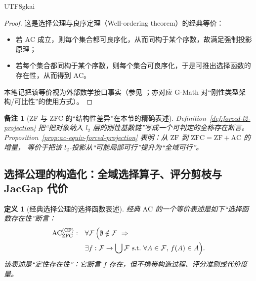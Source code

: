 \documentclass[12pt]{article}
\newtheorem{definition}{定义}[section]
\newtheorem{remark}{备注}[section]
\newcommand{\ZF}{\ensuremath{\mathrm{ZF}}}
\newcommand{\ZFC}{\ensuremath{\mathrm{ZFC}}}
\newcommand{\AC}{\ensuremath{\mathrm{AC}}}
\begin{document}
\begin{CJK*}{UTF8}{gkai}
\begin{proof}
这是选择公理与良序定理（Well-ordering theorem）的经典等价：
\begin{itemize}
  \item 若 $\AC$ 成立，则每个集合都可良序化，从而同构于某个序数，故满足强制投影原理；
  \item 若每个集合都同构于某个序数，则每个集合可良序化，于是可推出选择函数的存在性，从而得到 $\AC$。
\end{itemize}
本笔记把该等价视为外部数学接口事实（参见 \cite{JechSetTheory}；亦对应 G-Math\cite{GaoZheng2025GFramework} 对“刚性类型架构/可比性”的使用方式）。
\end{proof}

\begin{remark}[ZF 与 ZFC 的“结构性差异”在本节的精确表述]
Definition~\ref{def:forced-l2-projection} 把“把对象纳入 $l_2$ 层的刚性基数链”写成一个可判定的全称存在断言。
Proposition~\ref{prop:ac-equiv-forced-projection} 表明：从 $\ZF$ 到 $\ZFC=\ZF+\AC$ 的增量，
等价于把该 $l_2$-投影从“可能局部可行”提升为“全域可行”。
\end{remark}

\subsection{选择公理的构造化：全域选择算子、评分剪枝与 JacGap 代价}
\label{sec:ac-constructive-operator}

\begin{definition}[经典选择公理的选择函数表述]
\label{def:ac-choice-function}
经典 $\AC$ 的一个等价表述是如下“选择函数存在性”断言：
\begin{equation}
\label{eq:ac-choice-function}
\begin{aligned}
\AC_{\ZFC}^{(\mathrm{CF})}:\quad
&\forall \mathcal{F}\,
\Bigl(\emptyset\notin\mathcal{F}\ \Rightarrow\\
&\exists f:\mathcal{F}\to \bigcup \mathcal{F}\ \text{s.t.}\ \forall A\in\mathcal{F},\, f(A)\in A\Bigr).
\end{aligned}
\end{equation}
该表述是“定性存在性”：它断言 $f$ 存在，但不携带构造过程、评分准则或代价度量。
\end{definition}


\end{CJK*}
\end{document}
